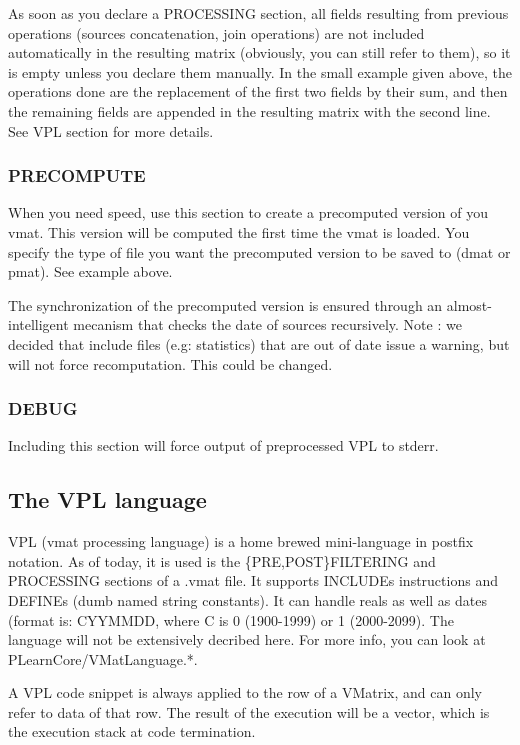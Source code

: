 \documentclass[11pt]{book}
\begin{document}
As soon as you declare a PROCESSING section, all fields resulting from previous operations (sources concatenation, join operations) are not included automatically in the resulting matrix (obviously, you can still refer to them), so it is empty unless you declare them manually. In the small example given above, the operations done are the replacement of the first two fields by their sum, and then the remaining fields are appended in the resulting matrix with the second line. See VPL section for more details.

\subsubsection{PRECOMPUTE}
When you need speed, use this section to create a precomputed version of you vmat. This version will be computed the first time the vmat is loaded. You specify the type of file you want the precomputed version to be saved to (dmat or pmat). See example above.

The synchronization of the precomputed version is ensured through an almost-intelligent mecanism that checks the date of sources recursively. Note : we decided that include files (e.g: statistics) that are out of date issue a warning, but will not force recomputation. This could be changed. 

\subsubsection{DEBUG}
Including this section will force output of preprocessed VPL to stderr.

\subsection{The VPL language}
VPL (vmat processing language) is a home brewed mini-language in postfix notation. As of today, it is used is the \{PRE,POST\}FILT\-ERING and PROCESSING sections of a .vmat file. It supports INCLUDEs instructions and DEFINEs (dumb named string constants). It can handle reals as well as dates (format is: CYYMMDD, where C is 0 (1900-1999) or 1 (2000-2099). The language will not be extensively decribed here. For more info, you can look at PLearnCore/VMatLanguage.*. 

A VPL code snippet is always applied to the row of a VMatrix, and can only refer to data of that row. The result of the execution will be a vector, which is the execution stack at code termination. 
\end{document}
